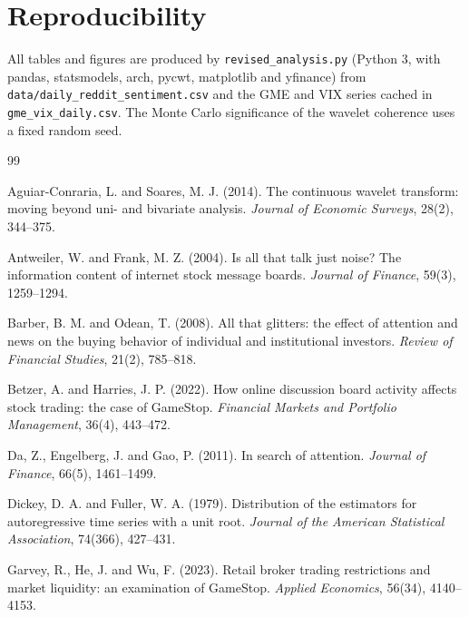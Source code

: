 \documentclass[11pt,a4paper]{article}
\begin{document}
\section*{Reproducibility}

All tables and figures are produced by \texttt{revised\_analysis.py} (Python 3,
with pandas, statsmodels, arch, pycwt, matplotlib and yfinance) from
\texttt{data/daily\_reddit\_sentiment.csv} and the GME and VIX series cached in
\texttt{gme\_vix\_daily.csv}. The Monte Carlo significance of the wavelet
coherence uses a fixed random seed.

\begin{thebibliography}{99}
\setlength{\itemsep}{1pt}\small

Aguiar-Conraria, L. and Soares, M. J. (2014). The continuous wavelet transform:
moving beyond uni- and bivariate analysis. \emph{Journal of Economic Surveys},
28(2), 344--375.

Antweiler, W. and Frank, M. Z. (2004). Is all that talk just noise? The
information content of internet stock message boards. \emph{Journal of Finance},
59(3), 1259--1294.

Barber, B. M. and Odean, T. (2008). All that glitters: the effect of attention
and news on the buying behavior of individual and institutional investors.
\emph{Review of Financial Studies}, 21(2), 785--818.

Betzer, A. and Harries, J. P. (2022). How online discussion board activity
affects stock trading: the case of GameStop. \emph{Financial Markets and Portfolio
Management}, 36(4), 443--472.

Da, Z., Engelberg, J. and Gao, P. (2011). In search of attention. \emph{Journal of
Finance}, 66(5), 1461--1499.

Dickey, D. A. and Fuller, W. A. (1979). Distribution of the estimators for
autoregressive time series with a unit root. \emph{Journal of the American
Statistical Association}, 74(366), 427--431.

Garvey, R., He, J. and Wu, F. (2023). Retail broker trading restrictions and
market liquidity: an examination of GameStop. \emph{Applied Economics}, 56(34),
4140--4153.


\end{thebibliography}
\end{document}

